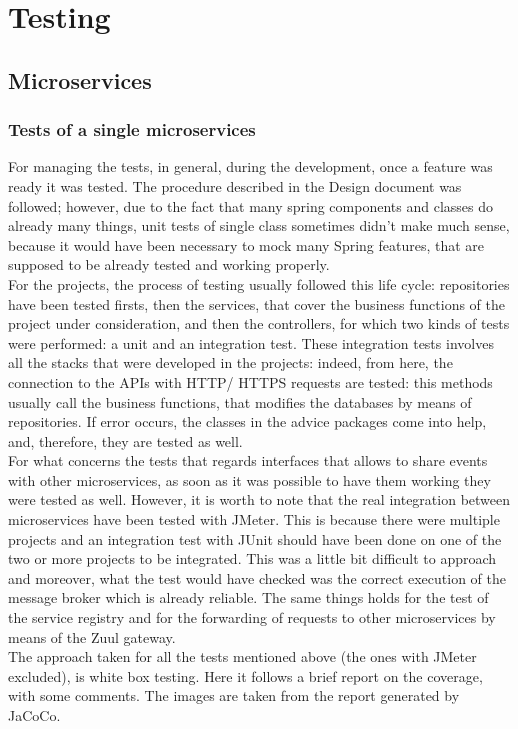 \section{Testing}
\subsection{Microservices}
\subsubsection{Tests of a single microservices}
For managing the tests, in general, during the development, once a feature was ready it was tested. 
The procedure described in the Design document was followed; however, due to the fact that many spring
components and classes do already many things, unit tests of single class sometimes didn't make much 
sense, because it would have been necessary to mock many Spring features, that are supposed to be already
tested and working properly. \\
For the projects, the process of testing usually followed this life cycle: repositories have been tested firsts, then the services, that cover
the business functions of the project under consideration, and then the controllers, for which two kinds of tests were performed: a unit and
an integration test.
These integration tests involves all the stacks that were developed in the projects: indeed, from here, the connection to the APIs with HTTP/
HTTPS requests are tested: this methods usually call the business functions, that modifies the databases by means of repositories.
If error occurs, the classes in the advice packages come into help, and, therefore, they are tested as well. \\
For what concerns the tests that regards interfaces that allows to share events with other microservices, as soon as it was possible to have
them working they were tested as well. 
However, it is worth to note that the real integration between microservices have been tested with JMeter. This is because there were multiple projects and an integration test with JUnit should have been done on one of the two or more projects to be integrated. This was a little bit difficult to approach and moreover, what the test would have checked was the correct execution of the message broker which is already reliable.
The same things holds for the test of the service registry and for the forwarding of requests to other microservices by means of the Zuul
gateway.  \\
The approach taken for all the tests mentioned above (the ones with JMeter excluded), is white box testing. 
Here it follows a brief report on the coverage, with some comments. The images are taken
from the report generated by JaCoCo. \\


